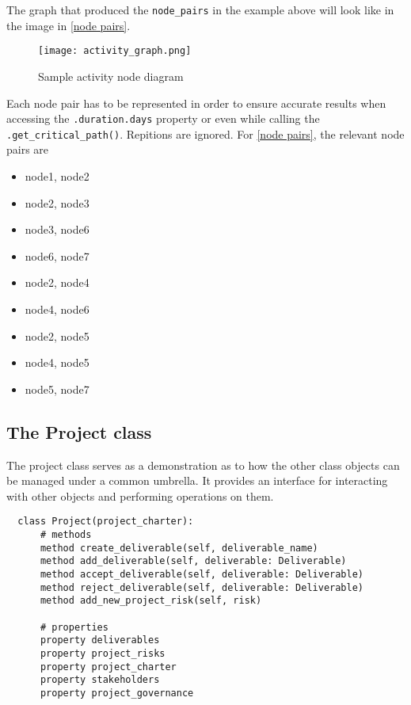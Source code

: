 The graph that produced the \verb+node_pairs+ in the example above will look like in the image in \autoref{node pairs}.

\begin{figure}[H]
  \centering
  \texttt{[image: activity\_graph.png]}
  \caption{Sample activity node diagram}
  \label{node pairs}
\end{figure}

Each node pair has to be represented in order to ensure accurate results when accessing the \verb+.duration.days+ property or even while calling the \linebreak\verb+.get_critical_path()+. Repitions are ignored. For \autoref{node pairs}, the relevant node pairs are 

\begin{itemize}
  \item node1, node2
  \item node2, node3
  \item node3, node6
  \item node6, node7
  \item node2, node4
  \item node4, node6
  \item node2, node5
  \item node4, node5
  \item node5, node7
\end{itemize}


\subsection{The Project class}
The project class serves as a demonstration as to how the other class objects can be managed under a common umbrella. It provides an interface for interacting with other objects and performing operations on them.

\begin{lstlisting}
  class Project(project_charter):
      # methods
      method create_deliverable(self, deliverable_name)
      method add_deliverable(self, deliverable: Deliverable)
      method accept_deliverable(self, deliverable: Deliverable)
      method reject_deliverable(self, deliverable: Deliverable)
      method add_new_project_risk(self, risk)

      # properties
      property deliverables
      property project_risks
      property project_charter
      property stakeholders
      property project_governance
\end{lstlisting}

